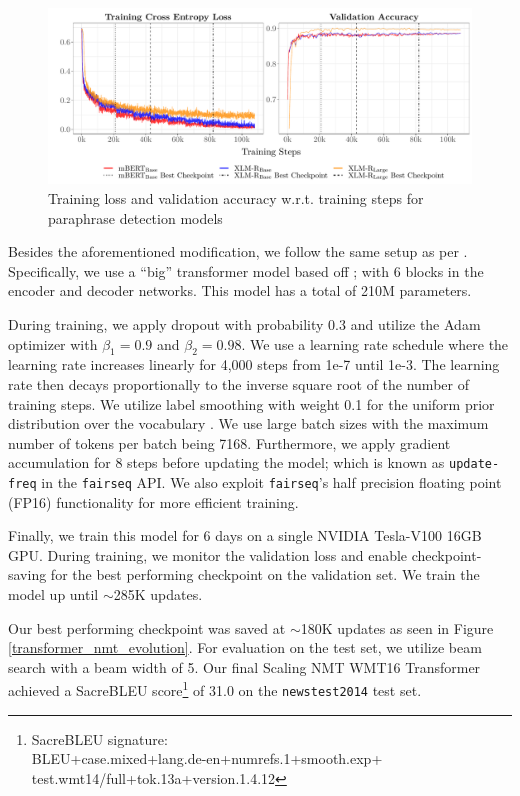 \documentclass[11pt,a4paper]{article}
\begin{document}
\begin{figure}
  \centering 
  \includegraphics[trim={0.7cm 0cm 0cm 0cm},clip,width=\textwidth]{paraphrase_detection_models_evolution.pdf}
  \caption{Training loss and validation accuracy w.r.t. training steps for paraphrase detection models}
  \label{paraphrase_detection_model_evolution}
\end{figure}

Besides the aforementioned modification, we follow the same setup as per \citet{ott2018scaling}. Specifically, we use a ``big'' transformer model based off \citet{vaswani2017attention}; with 6 blocks in the encoder and decoder networks. This model has a total of 210M parameters.

During training, we apply dropout \cite{srivastava2014dropout} with probability 0.3 and utilize the Adam optimizer \cite{kingma2014adam} with $\beta_1 = 0.9$ and $\beta_2=0.98$. We use a learning rate schedule where the learning rate increases linearly for 4,000 steps from 1e-7 until 1e-3. The learning rate then decays proportionally to the inverse square root of the number of training steps. We utilize label smoothing with weight 0.1 for the uniform prior distribution over the vocabulary \cite{pereyra2017regularizing}. We use large batch sizes with the maximum number of tokens per batch being 7168. Furthermore, we apply gradient accumulation for 8 steps before updating the model; which is known as \texttt{update-freq} in the \texttt{fairseq} API. We also exploit \texttt{fairseq}'s half precision floating point (FP16) functionality for more efficient training.

Finally, we train this model for 6 days on a single NVIDIA Tesla-V100 16GB GPU. During training, we monitor the validation loss and enable checkpoint-saving for the best performing checkpoint on the validation set. We train the model up until $\sim$285K updates.

Our best performing checkpoint was saved at $\sim$180K updates as seen in Figure \ref{transformer_nmt_evolution}. For evaluation on the test set, we utilize beam search with a beam width of 5. Our final Scaling NMT WMT16 Transformer achieved a SacreBLEU \cite{post-2018-call} score\footnote{\footnotesize SacreBLEU signature:\\BLEU+case.mixed+lang.de\nobreakdash-en+numrefs.1+smooth.exp+\\test.wmt14/full+tok.13a+version.1.4.12} of 31.0 on the \texttt{newstest2014} test set.
\end{document}
